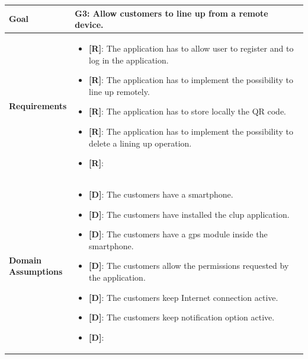 \begin{table}[H]
\centering
\begin{tabular}{| m{} | m{} |} 
	\hline
	\textbf{Goal} &
		\textbf{G3: Allow customers to line up from a remote device.} \\
	\hline
	\textbf{Requirements} &
		\begin{itemize}
			\item {\textbf{[R]}}: The application has to allow user to register and to log in the application.
			\item {\textbf{[R]}}: The application has to implement the possibility to line up remotely.
			\item {\textbf{[R]}}: The application has to store locally the QR code.
			\item {\textbf{[R]}}: The application has to implement the possibility to delete a lining up operation.
			\item {\textbf{[R]}}:
		\end{itemize} \\ 
	\hline
	\shortstack[l]{\textbf{Domain} \\ \textbf{Assumptions}} & 
		\begin{itemize}
			\item {\textbf{[D]}}: The customers have a smartphone.
			\item {\textbf{[D]}}: The customers have installed the \gls{clup} application.
			\item {\textbf{[D]}}: The customers have a \gls{gps} module inside the smartphone.
			\item {\textbf{[D]}}: The customers allow the permissions requested by the application.
			\item {\textbf{[D]}}: The customers keep Internet connection active.
			\item {\textbf{[D]}}: The customers keep notification option active.
			\item {\textbf{[D]}}:
		\end{itemize} \\ 
	\hline
\end{tabular}
\end{table}

